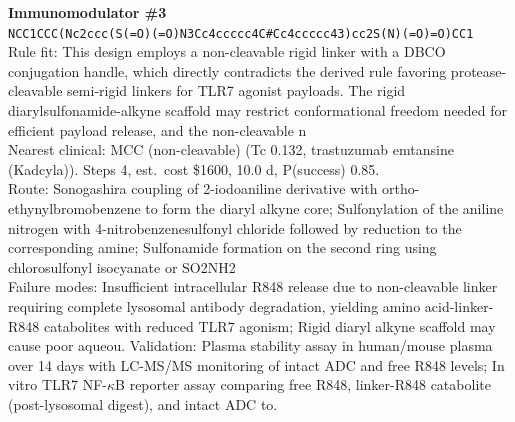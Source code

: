 \documentclass[10pt]{article}
\begin{document}
\noindent\textbf{Immunomodulator \#3} \\ \texttt{NCC1CCC(Nc2ccc(S(=O)(=O)N3Cc4ccccc4C\#Cc4ccccc43)cc2S(N)(=O)=O)CC1} \\ Rule fit: This design employs a non-cleavable rigid linker with a DBCO conjugation handle, which directly contradicts the derived rule favoring protease-cleavable semi-rigid linkers for TLR7 agonist payloads. The rigid diarylsulfonamide-alkyne scaffold may restrict conformational freedom needed for efficient payload release, and the non-cleavable n \\ Nearest clinical: MCC (non-cleavable) (Tc 0.132, trastuzumab emtansine (Kadcyla)). Steps 4, est.\ cost \$1600, 10.0 d, P(success) 0.85. \\ Route: Sonogashira coupling of 2-iodoaniline derivative with ortho-ethynylbromobenzene to form the diaryl alkyne core; Sulfonylation of the aniline nitrogen with 4-nitrobenzenesulfonyl chloride followed by reduction to the corresponding amine; Sulfonamide formation on the second ring using chlorosulfonyl isocyanate or SO2NH2  \\ Failure modes: Insufficient intracellular R848 release due to non-cleavable linker requiring complete lysosomal antibody degradation, yielding amino acid-linker-R848 catabolites with reduced TLR7 agonism; Rigid diaryl alkyne scaffold may cause poor aqueou. Validation: Plasma stability assay in human/mouse plasma over 14 days with LC-MS/MS monitoring of intact ADC and free R848 levels; In vitro TLR7 NF-$\kappa$B reporter assay comparing free R848, linker-R848 catabolite (post-lysosomal digest), and intact ADC to. \\[0.4em]
\end{document}
